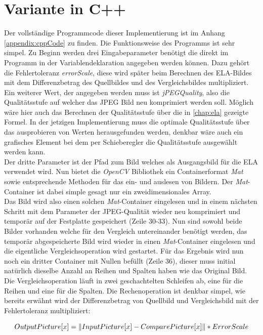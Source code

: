\section{Variante in C++}
Der vollständige Programmcode dieser Implementierung ist im Anhang \autoref{appendix:cppCode} zu finden. Die Funktionsweise des Programms ist sehr simpel. Zu Beginn werden drei Eingabeparameter benötigt die direkt im Programm in der Variablendeklaration angegeben werden können. Dazu gehört die Fehlertoleranz \emph{errorScale}, diese wird später beim Berechnen des ELA-Bildes mit dem Differenzbetrag des Quellbildes und des Vergleichsbildes multipliziert.\\
Ein weiterer Wert, der angegeben werden muss ist \emph{jPEGQuality}, also die Qualitätsstufe auf welcher das JPEG Bild neu komprimiert werden soll. Möglich wäre hier auch das Berechnen der Qualitätsstufe über die in \autoref{chap:ela} gezeigte Formel. In der jetzigen Implementierung muss die optimale Qualitätsstufe über das ausprobieren von Werten herausgefunden werden, denkbar wäre auch ein grafisches Element bei dem per Schieberegler die Qualitätsstufe ausgewählt werden kann.\\
Der dritte Parameter ist der Pfad zum Bild welches als Ausgangsbild für die ELA verwendet wird. Nun bietet die \emph{OpenCV} Bibliothek ein Containerformat \emph{Mat} sowie entsprechende Methoden für das ein- und auslesen von Bildern. Der \emph{Mat}-Container ist dabei simple gesagt nur ein zweidimensionales Array.\\
Das Bild wird also einen solchen \emph{Mat}-Container eingelesen und in einem nächsten Schritt mit dem Parameter der JPEG-Qualität wieder neu komprimiert und temporär auf der Festplatte gespeichert (Zeile 30-33). Nun sind sowohl beide Bilder vorhanden welche für den Vergleich untereinander benötigt werden, das temporär abgespeicherte Bild wird wieder in einen \emph{Mat}-Container eingelesen und die eigentliche Vergleichsoperation wird gestartet. Für das Ergebnis wird nun noch ein dritter Container mit Nullen befüllt (Zeile 36), dieser muss initial natürlich dieselbe Anzahl an Reihen und Spalten haben wie das Original Bild.\\

Die Vergleichsoperation läuft in zwei geschachtelten Schleifen ab, eine für die Reihen und eine für die Spalten. Die Rechenoperation ist denkbar simpel, wie bereits erwähnt wird der Differenzbetrag von Quellbild und Vergleichsbild mit der Fehlertoleranz multipliziert:

\[\tiny OutputPicture[x] = \left \| InputPicture[x] - ComparePicture[x] \right \| * ErrorScale\]


